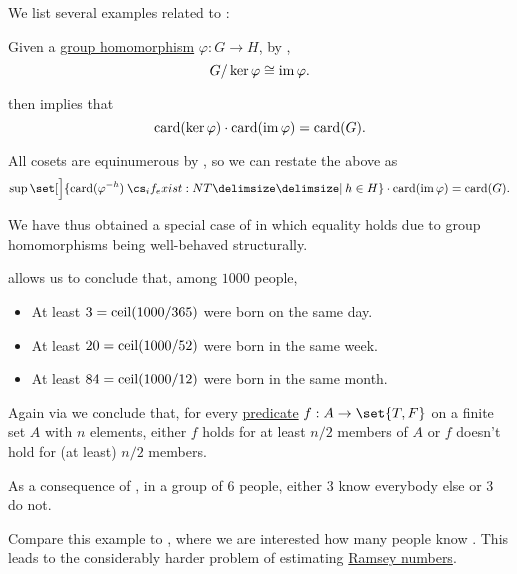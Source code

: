 \begin{example}\label{ex:thm:pigeonhole_principle}
  We list several examples related to :
  \begin{thmenum}
     Given a \hyperref[def:group/homomorphism]{group homomorphism} \( \varphi: G \to H \), by ,
    \begin{equation*}
      G / \ker \varphi \cong \operatorname{im} \varphi.
    \end{equation*}

     then implies that
    \begin{equation*}
      \operatorname{card}(\ker \varphi) \cdot \operatorname{card}(\operatorname{im} \varphi) = \operatorname{card}(G).
    \end{equation*}

    All cosets are equinumerous by , so we can restate the above as
    \begin{equation*}
      \sup\set[\Big]{ \card(\varphi^{-h}) \given* h \in H } \cdot \card(\img \varphi) = \card(G).
    \end{equation*}

    We have thus obtained a special case of  in which equality holds due to group homomorphisms being well-behaved structurally.

      allows us to conclude that, among \( 1000 \) people,
    \begin{itemize}
      \item At least \( 3 = \operatorname{ceil}(1000 / 365) \) were born on the same day.
      \item At least \( 20 = \operatorname{ceil}(1000 / 52) \) were born in the same week.
      \item At least \( 84 = \operatorname{ceil}(1000 / 12) \) were born in the same month.
    \end{itemize}

     Again via  we conclude that, for every \hyperref[def:boolean_function]{predicate} \( f: A \to \set{ T, F } \) on a finite set \( A \) with \( n \) elements, either \( f \) holds for at least \( n / 2 \) members of \( A \) or \( f \) doesn't hold for (at least) \( n / 2 \) members.

     As a consequence of , in a group of \( 6 \) people, either \( 3 \) know everybody else or \( 3 \) do not.

    Compare this example to , where we are interested how many people know . This leads to the considerably harder problem of estimating \hyperref[def:ramsey_number]{Ramsey numbers}.
  \end{thmenum}
\end{example}

